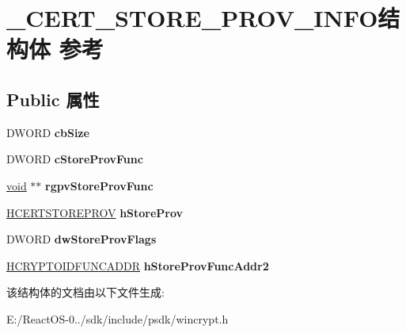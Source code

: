 \hypertarget{struct___c_e_r_t___s_t_o_r_e___p_r_o_v___i_n_f_o}{}\section{\+\_\+\+C\+E\+R\+T\+\_\+\+S\+T\+O\+R\+E\+\_\+\+P\+R\+O\+V\+\_\+\+I\+N\+F\+O结构体 参考}
\label{struct___c_e_r_t___s_t_o_r_e___p_r_o_v___i_n_f_o}
\subsection*{Public 属性}
\begin{DoxyCompactItemize}
\item 
\mbox{\label{struct___c_e_r_t___s_t_o_r_e___p_r_o_v___i_n_f_o_a51c8aa1e1bee8596ea75335c0dd3db57}} 
D\+W\+O\+RD {\bfseries cb\+Size}
\item 
\mbox{\label{struct___c_e_r_t___s_t_o_r_e___p_r_o_v___i_n_f_o_a4426102b2b86e4d83ae28205d470303e}} 
D\+W\+O\+RD {\bfseries c\+Store\+Prov\+Func}
\item 
\mbox{\label{struct___c_e_r_t___s_t_o_r_e___p_r_o_v___i_n_f_o_a92b0185ff4edbfc81a1696c410b9a6b6}} 
\hyperlink{interfacevoid}{void} $\ast$$\ast$ {\bfseries rgpv\+Store\+Prov\+Func}
\item 
\mbox{\label{struct___c_e_r_t___s_t_o_r_e___p_r_o_v___i_n_f_o_afda9d4ff4097a841ba692a44be529f75}} 
\hyperlink{interfacevoid}{H\+C\+E\+R\+T\+S\+T\+O\+R\+E\+P\+R\+OV} {\bfseries h\+Store\+Prov}
\item 
\mbox{\label{struct___c_e_r_t___s_t_o_r_e___p_r_o_v___i_n_f_o_a82d4566e8ebb29c98b4c0f8555823efe}} 
D\+W\+O\+RD {\bfseries dw\+Store\+Prov\+Flags}
\item 
\mbox{\label{struct___c_e_r_t___s_t_o_r_e___p_r_o_v___i_n_f_o_af8f493b0f2b69fc074022d08505d1aa0}} 
\hyperlink{interfacevoid}{H\+C\+R\+Y\+P\+T\+O\+I\+D\+F\+U\+N\+C\+A\+D\+DR} {\bfseries h\+Store\+Prov\+Func\+Addr2}
\end{DoxyCompactItemize}


该结构体的文档由以下文件生成\+:\begin{DoxyCompactItemize}
\item 
E\+:/\+React\+O\+S-\/0../sdk/include/psdk/wincrypt.\+h\end{DoxyCompactItemize}
